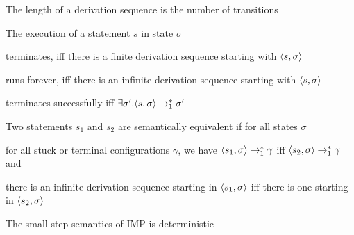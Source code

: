 		\item The length of a derivation sequence is the number of transitions
	\enumend
	\item The execution of a statement $s$ in state $\sigma$
	\enumstart
		\item terminates, iff there is a finite derivation sequence starting with $\langle s, \sigma\rangle$
		\item runs forever, iff there is an infinite derivation sequence starting with $\langle s, \sigma \rangle$
		\item terminates successfully iff $\exists \sigma'. \langle s, \sigma \rangle \rightarrow_1^* \sigma'$
	\enumend
	\item Two statements $s_1$ and $s_2$ are semantically equivalent if for all states $\sigma$
	\enumstart
		\item for all stuck or terminal configurations $\gamma$, we have $\langle s_1, \sigma \rangle \rightarrow_1^* \gamma$ iff $\langle s_2, \sigma \rangle \rightarrow_1^* \gamma$ and
		\item there is an infinite derivation sequence starting in $\langle s_1, \sigma \rangle$ iff there is one starting in $\langle s_2, \sigma \rangle$
	\enumend
	\item The small-step semantics of IMP is deterministic
\enumend
